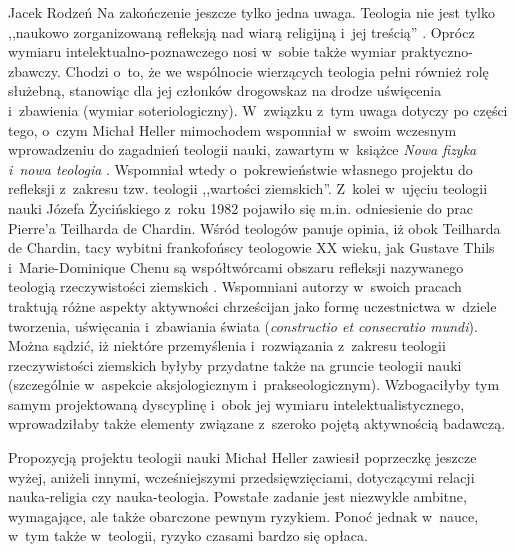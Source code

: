 \begin{newrevplenv}{Jacek Rodzeń}
Na zakończenie jeszcze tylko jedna uwaga. Teologia nie jest tylko ,,naukowo zorganizowaną refleksją nad wiarą religijną i~jej treścią''
\parencite[][s.~23]{heller_nauka_2019}. %
 Oprócz wymiaru intelektualno-poznawczego nosi w~sobie także wymiar praktyczno-zbawczy. Chodzi o~to, że we wspólnocie wierzących teologia pełni również rolę służebną, stanowiąc dla jej członków drogowskaz na drodze uświęcenia i~zbawienia (wymiar soteriologiczny). W~związku z~tym uwaga dotyczy po części tego, o~czym Michał Heller mimochodem wspomniał w~swoim wczesnym wprowadzeniu do zagadnień teologii nauki, zawartym w~książce \textit{Nowa fizyka i~nowa teologia} 
\parencite[][]{heller_nowa_1992}.%
 Wspomniał wtedy o~pokrewieństwie własnego projektu do refleksji z~zakresu tzw. teologii ,,wartości ziemskich''. Z~kolei w~ujęciu teologii nauki Józefa Życińskiego z~roku 1982 pojawiło się m.in. odniesienie do prac Pierre’a Teilharda de Chardin. Wśród teologów panuje opinia, iż obok Teilharda de Chardin, tacy wybitni frankofońscy teologowie XX wieku, jak Gustave Thils i~Marie-Dominique Chenu są współtwórcami obszaru refleksji nazywanego teologią rzeczywistości ziemskich 
\parencites[zob. np.][]{thils_theologie_1946}[][]{thils_theologie_1949}[][]{graczyk_francuska_1992}. %
 Wspomniani autorzy w~swoich pracach traktują różne aspekty aktywności chrześcijan jako formę uczestnictwa w~dziele tworzenia, uświęcania i~zbawiania świata (\textit{constructio et consecratio mundi}). Można sądzić, iż niektóre przemyślenia i~rozwiązania z~zakresu teologii rzeczywistości ziemskich byłyby przydatne także na gruncie teologii nauki (szczególnie w~aspekcie aksjologicznym i~prakseologicznym). Wzbogaciłyby tym samym projektowaną dyscyplinę i~obok jej wymiaru intelektualistycznego, wprowadziłaby także elementy związane z~szeroko pojętą aktywnością badawczą.

Propozycją projektu teologii nauki Michał Heller zawiesił poprzeczkę jeszcze wyżej, aniżeli innymi, wcześniejszymi przedsięwzięciami, dotyczącymi relacji nauka-religia czy nauka-teologia. Powstałe zadanie jest niezwykle ambitne, wymagające, ale także obarczone pewnym ryzykiem. Ponoć jednak w~nauce, w~tym także w~teologii, ryzyko czasami bardzo się opłaca.




\vspace{5mm}%
\begin{flushright}
{\chaptitleeng\color{black!50}{Theology of science --~doomed to success?}}
\end{flushright}


\end{newrevplenv}
